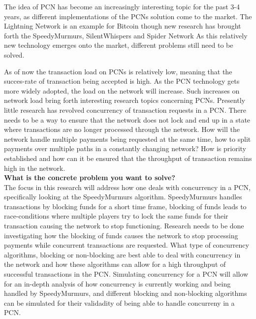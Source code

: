 \documentclass{article}
\newcounter{mn}
\newcommand{\superscript}[1]{\ensuremath{{}^{\textrm{\scriptsize #1}}}}
\newcommand{\mntext}[1]{\colorbox{pink}{\begin{color}{black}#1\end{color}}}
\newcommand{\mn}[2][]{{\tiny\superscript{\mntext{\arabic{mn}}}}\marginpar{\scriptsize{
  \ifthenelse{\isempty{#1}}
  {\mntext{\parbox{0.95\marginparwidth}{\superscript{\arabic{mn}} \raggedright{#2}}}}
  {\mntext{\parbox{0.95\marginparwidth}{\superscript{\arabic{mn}}#1 says: \raggedright{#2}}}}
}}\stepcounter{mn}}
\begin{document}
The idea of PCN has become an increasingly interesting topic for the past 3-4 years, as different implementations of the PCNs solution come to the market. The Lightning Network is an example for Bitcoin\cite{poon2016bitcoin} though new research has brought forth the SpeedyMurmurs, SilentWhispers and Spider Network As this relatively new technology emerges onto the market, different problems still need to be solved. 

As of now the transaction load on PCNs is relatively low, meaning that the succes-rate of transaction being accepted is high. As the PCN technology gets more widely adopted, the load on the network will increase. Such increases on network load bring forth interesting research topics concerning PCNs. Presently little research has revolved concurrency of transaction requests in a PCN. There needs to be a way to ensure that the network does not lock and end up in a state where transactions are no longer processed through the network. How will the network handle multiple payments being requested at the same time, how to split payments over multiple paths in a constantly changing network? How is priority established and how can it be ensured that the throughput of transaction remains high in the network.\\

\textbf{What is the concrete problem you want to solve?} \\

The focus in this research will address how one deals with concurrency in a PCN, specifically looking at the SpeedyMurmurs algorithm. SpeedyMurmurs handles transactions by blocking funds for a short time frame, blocking of funds leads to race-conditions where multiple players try to lock the same funds for their transaction causing the network to stop functioning. Research needs to be done investigating how the blocking of funds causes the network to stop processing payments while concurrent transactions are requested. What type of concurrency algorithms, blocking or non-blocking are best able to deal with concurrency in the network and how these algorithms can allow for a high throughput of successful transactions in the PCN. Simulating concurrency for a PCN will allow for an in-depth analysis of how concurrency is currently working and being handled by SpeedyMurmurs, and different blocking and non-blocking algorithms can be simulated for their validadity of being able to handle concurreny in a PCN.\\
\end{document}
